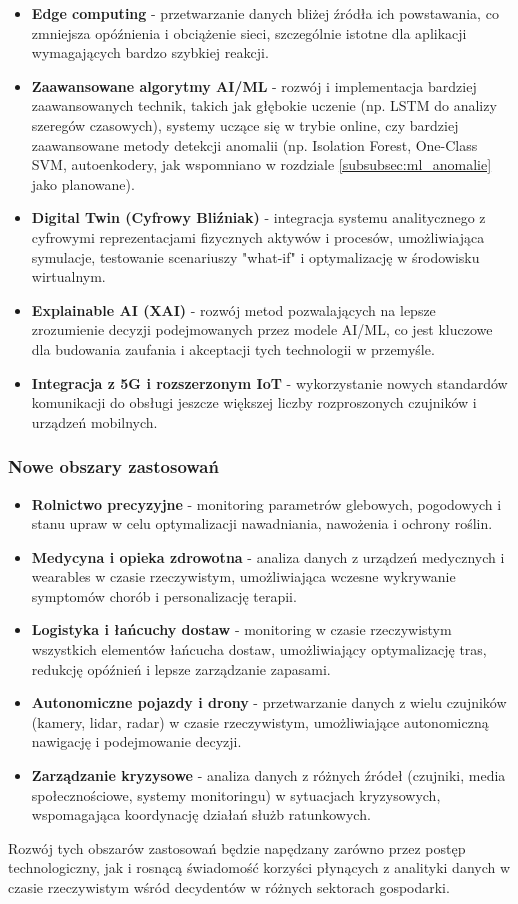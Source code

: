 \begin{itemize}
    \item \textbf{Edge computing} - przetwarzanie danych bliżej źródła ich powstawania, co zmniejsza opóźnienia i obciążenie sieci, szczególnie istotne dla aplikacji wymagających bardzo szybkiej reakcji.
    \item \textbf{Zaawansowane algorytmy AI/ML} - rozwój i implementacja bardziej zaawansowanych technik, takich jak głębokie uczenie (np. LSTM do analizy szeregów czasowych), systemy uczące się w trybie online, czy bardziej zaawansowane metody detekcji anomalii (np. Isolation Forest, One-Class SVM, autoenkodery, jak wspomniano w rozdziale \ref{subsubsec:ml_anomalie} jako planowane).
    \item \textbf{Digital Twin (Cyfrowy Bliźniak)} - integracja systemu analitycznego z cyfrowymi reprezentacjami fizycznych aktywów i procesów, umożliwiająca symulacje, testowanie scenariuszy "what-if" i optymalizację w środowisku wirtualnym.
    \item \textbf{Explainable AI (XAI)} - rozwój metod pozwalających na lepsze zrozumienie decyzji podejmowanych przez modele AI/ML, co jest kluczowe dla budowania zaufania i akceptacji tych technologii w przemyśle.
    \item \textbf{Integracja z 5G i rozszerzonym IoT} - wykorzystanie nowych standardów komunikacji do obsługi jeszcze większej liczby rozproszonych czujników i urządzeń mobilnych.
\end{itemize}

\subsubsection{Nowe obszary zastosowań}
\label{subsubsec:nowe_obszary}

\begin{itemize}
    \item \textbf{Rolnictwo precyzyjne} - monitoring parametrów glebowych, pogodowych i stanu upraw w celu optymalizacji nawadniania, nawożenia i ochrony roślin.
    \item \textbf{Medycyna i opieka zdrowotna} - analiza danych z urządzeń medycznych i wearables w czasie rzeczywistym, umożliwiająca wczesne wykrywanie symptomów chorób i personalizację terapii.
    \item \textbf{Logistyka i łańcuchy dostaw} - monitoring w czasie rzeczywistym wszystkich elementów łańcucha dostaw, umożliwiający optymalizację tras, redukcję opóźnień i lepsze zarządzanie zapasami.
    \item \textbf{Autonomiczne pojazdy i drony} - przetwarzanie danych z wielu czujników (kamery, lidar, radar) w czasie rzeczywistym, umożliwiające autonomiczną nawigację i podejmowanie decyzji.
    \item \textbf{Zarządzanie kryzysowe} - analiza danych z różnych źródeł (czujniki, media społecznościowe, systemy monitoringu) w sytuacjach kryzysowych, wspomagająca koordynację działań służb ratunkowych.
\end{itemize}

Rozwój tych obszarów zastosowań będzie napędzany zarówno przez postęp technologiczny, jak i rosnącą świadomość korzyści płynących z analityki danych w czasie rzeczywistym wśród decydentów w różnych sektorach gospodarki. 